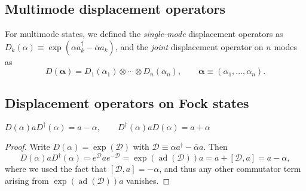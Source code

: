 \documentclass[12pt]{report}
\newcommand{\on}[1]{\operatorname{#1}}
\newcommand{\bs}[1]{\boldsymbol{#1}}
\newcommand{\calD}{{\mathcal{D}}}
\begin{document}
\subsection{Multimode displacement operators}

\begin{defn}
	For multimode states, we defined the \emph{single-mode} displacement operators as
	$D_k(\alpha)\equiv\exp(\alpha a^\dagger_k-\bar\alpha a_k)$,
	and the \emph{joint} displacement operator on $n$ modes as
	\begin{equation}
		D(\bs\alpha)
		= D_1(\alpha_1)\otimes\cdots\otimes D_n(\alpha_n),
		\qquad \bs\alpha\equiv (\alpha_1,...,\alpha_n).
	\end{equation}
\end{defn}

\subsection{Displacement operators on Fock states}

\begin{prop}
		$D(\alpha) a D^\dagger(\alpha) = a - \alpha,
				\qquad D^\dagger(\alpha) a D(\alpha) = a + \alpha$
\end{prop}
\begin{proof}
	Write $D(\alpha)=\exp(\calD)$ with $\calD\equiv \alpha a^\dagger-\bar\alpha a$.
	Then
	\begin{equation}
		D(\alpha) a D^\dagger(\alpha)
		= e^\calD a e^{-\calD}
		= \exp(\on{ad}(\calD)) a
		= a + [\calD,a] = a-\alpha,
	\end{equation}
	where we used the fact that $[\calD,a]=-\alpha$, and thus any other commutator term arising from $\exp(\on{ad}(\calD))a$ vanishes.
\end{proof}
\end{document}
